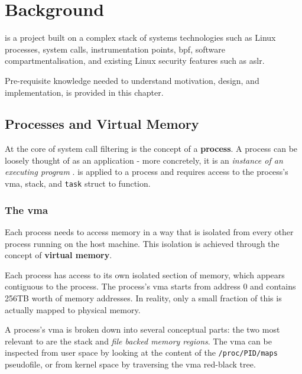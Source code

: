 \section{Background} \label{sec:background}



\af is a project built on a complex stack of systems technologies such as Linux
processes, system calls, instrumentation points, \ac{bpf}, software
compartmentalisation, and existing Linux security features such as \ac{aslr}.

Pre-requisite knowledge needed to understand \afg motivation, design, and
implementation, is provided in this chapter. 

\subsection{Processes and Virtual Memory}

At the core of system call filtering is the concept of a \textbf{process}. A
process can be loosely thought of as an application - more concretely, it is an
\textit{instance of an executing program} \cite{LINUX_PROGRAMMING_INTERFACE}.
\af is applied to a process and requires access to the process's \ac{vma},
stack, and \texttt{task} struct to function.

\subsubsection*{The \acl{vma}}
Each process needs to access memory in a way that is isolated from every other
process running on the host machine. This isolation is achieved through the
concept of \textbf{virtual memory}.

Each process has access to its own isolated section of memory, which appears
contiguous to the process. The process's \ac{vma} starts from address 0 and
contains 256TB worth of memory addresses. In reality, only a small fraction of
this is actually mapped to physical memory. 

A process's \ac{vma} is broken down into several conceptual parts: the two
most relevant to \af are the stack and \textit{file backed
memory regions}. The \ac{vma} can be inspected from user space by looking at the 
content of the \texttt{/proc/PID/maps} pseudofile, or from kernel space by
traversing the \ac{vma} red-black tree.

